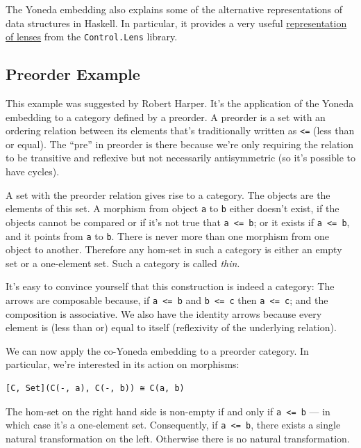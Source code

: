 The Yoneda embedding also explains some of the alternative
representations of data structures in Haskell. In particular, it
provides a very useful
\href{https://bartoszmilewski.com/2015/07/13/from-lenses-to-yoneda-embedding/}{representation
of lenses} from the \texttt{Control.Lens} library.

\subsection{Preorder Example}\label{preorder-example}

This example was suggested by Robert Harper. It's the application of the
Yoneda embedding to a category defined by a preorder. A preorder is a
set with an ordering relation between its elements that's traditionally
written as \texttt{\textless{}=} (less than or equal). The ``pre'' in
preorder is there because we're only requiring the relation to be
transitive and reflexive but not necessarily antisymmetric (so it's
possible to have cycles).

A set with the preorder relation gives rise to a category. The objects
are the elements of this set. A morphism from object \texttt{a} to
\texttt{b} either doesn't exist, if the objects cannot be compared or if
it's not true that \texttt{a\ \textless{}=\ b}; or it exists if
\texttt{a\ \textless{}=\ b}, and it points from \texttt{a} to
\texttt{b}. There is never more than one morphism from one object to
another. Therefore any hom-set in such a category is either an empty set
or a one-element set. Such a category is called \emph{thin}.

It's easy to convince yourself that this construction is indeed a
category: The arrows are composable because, if
\texttt{a\ \textless{}=\ b} and \texttt{b\ \textless{}=\ c} then
\texttt{a\ \textless{}=\ c}; and the composition is associative. We also
have the identity arrows because every element is (less than or) equal
to itself (reflexivity of the underlying relation).

We can now apply the co-Yoneda embedding to a preorder category. In
particular, we're interested in its action on morphisms:

\begin{verbatim}
[C, Set](C(-, a), C(-, b)) ≅ C(a, b)
\end{verbatim}

The hom-set on the right hand side is non-empty if and only if
\texttt{a\ \textless{}=\ b} --- in which case it's a one-element set.
Consequently, if \texttt{a\ \textless{}=\ b}, there exists a single
natural transformation on the left. Otherwise there is no natural
transformation.

